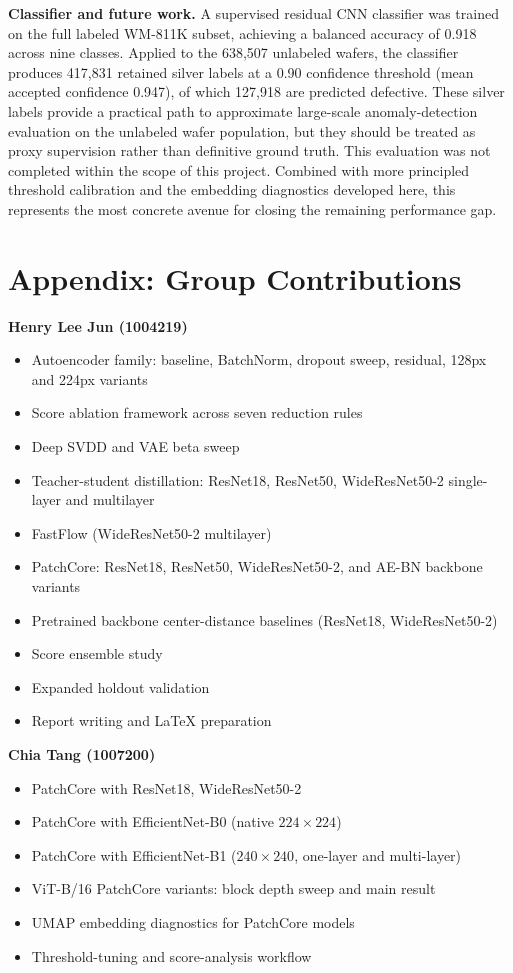 \documentclass[11pt]{article}
\begin{document}
\textbf{Classifier and future work.} A supervised residual CNN classifier was trained on the full labeled
WM-811K subset, achieving a balanced accuracy of 0.918 across nine classes. Applied to the 638,507
unlabeled wafers, the classifier produces 417,831 retained silver labels at a 0.90 confidence threshold
(mean accepted confidence 0.947), of which 127,918 are predicted defective. These silver labels provide
a practical path to approximate large-scale anomaly-detection evaluation on the unlabeled wafer population,
but they should be treated as proxy supervision rather than definitive ground truth. This evaluation was
not completed within the scope of this project. Combined with more principled threshold calibration and the embedding diagnostics
developed here, this represents the most concrete avenue for closing the remaining performance gap.

\appendix
\newpage
\section{Appendix: Group Contributions}
\label{app:contributions}

\textbf{Henry Lee Jun (1004219)}
\begin{itemize}[leftmargin=1.5em]
  \item Autoencoder family: baseline, BatchNorm, dropout sweep, residual, 128px and 224px variants
  \item Score ablation framework across seven reduction rules
  \item Deep SVDD and VAE beta sweep
  \item Teacher-student distillation: ResNet18, ResNet50, WideResNet50-2 single-layer and multilayer
  \item FastFlow (WideResNet50-2 multilayer)
  \item PatchCore: ResNet18, ResNet50, WideResNet50-2, and AE-BN backbone variants
  \item Pretrained backbone center-distance baselines (ResNet18, WideResNet50-2)
  \item Score ensemble study
  \item Expanded holdout validation
  \item Report writing and \LaTeX{} preparation
\end{itemize}

\textbf{Chia Tang (1007200)}
\begin{itemize}[leftmargin=1.5em]
  \item PatchCore with ResNet18, WideResNet50-2
  \item PatchCore with EfficientNet-B0 (native $224\!\times\!224$)
  \item PatchCore with EfficientNet-B1 ($240\!\times\!240$, one-layer and multi-layer)
  \item ViT-B/16 PatchCore variants: block depth sweep and main result
  \item UMAP embedding diagnostics for PatchCore models
  \item Threshold-tuning and score-analysis workflow
\end{itemize}
\end{document}
